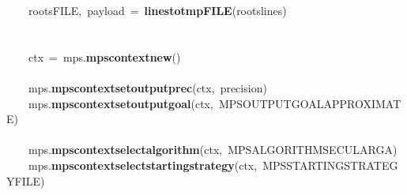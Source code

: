 \documentclass{article}\usepackage[]{graphicx}\usepackage[dvipsnames,table]{xcolor}
\makeatletter
\newcommand{\hlopt}[1]{\textcolor[rgb]{0,0,0}{#1}}%
\newcommand{\hldef}[1]{\textcolor[rgb]{0.345,0.345,0.345}{#1}}%
\newcommand{\hlkwd}[1]{\textcolor[rgb]{0.737,0.353,0.396}{\textbf{#1}}}%
\newenvironment{kframe}{%
 \def\at@end@of@kframe{}%
 \ifinner\ifhmode%
  \def\at@end@of@kframe{\end{minipage}}%
  \begin{minipage}{\columnwidth}%
 \fi\fi%
 \def\FrameCommand##1{\hskip\@totalleftmargin \hskip-\fboxsep
 \colorbox{shadecolor}{##1}\hskip-\fboxsep
     \hskip-\linewidth \hskip-\@totalleftmargin \hskip\columnwidth}%
 \MakeFramed {\advance\hsize-\width
   \@totalleftmargin\z@ \linewidth\hsize
   \@setminipage}}%
 {\par\unskip\endMakeFramed%
 \at@end@of@kframe}
\newenvironment{knitrout}{}{} %
\makeatother
\begin{document}
\begin{center}
\begin{minipage}[m]{18cm}
\begin{knitrout}
\begin{kframe}
\hldef{}\hldef{\ \ \ \ }\hldef{roots\textunderscore FILE}\hlopt{,\ }\hldef{payload\ }\hlopt{=\ }\hldef{}\hlkwd{\textunderscore lines\textunderscore to\textunderscore tmpFILE}\hldef{}\hlopt{(}\hldef{roots\textunderscore lines}\hlopt{)}\hspace*{\fill}\\
\hldef{}\hspace*{\fill}\\
\hldef{}\hldef{\ \ \ \ }\hldef{}\hspace*{\fill}\\
\hldef{}\hldef{\ \ \ \ }\hldef{ctx\ }\hlopt{=\ }\hldef{\textunderscore mps}\hlopt{.}\hldef{}\hlkwd{mps\textunderscore context\textunderscore new}\hldef{}\hlopt{()}\hspace*{\fill}\\
\hldef{}\hspace*{\fill}\\
\hldef{}\hldef{\ \ \ \ }\hldef{\textunderscore mps}\hlopt{.}\hldef{}\hlkwd{mps\textunderscore context\textunderscore set\textunderscore output\textunderscore prec}\hldef{}\hlopt{(}\hldef{ctx}\hlopt{,\ }\hldef{precision}\hlopt{)}\hspace*{\fill}\\
\hldef{}\hldef{\ \ \ \ }\hldef{\textunderscore mps}\hlopt{.}\hldef{}\hlkwd{mps\textunderscore context\textunderscore set\textunderscore output\textunderscore goal}\hldef{}\hlopt{(}\hldef{ctx}\hlopt{,\ }\hldef{MPS\textunderscore OUTPUT\textunderscore GOAL\textunderscore APPROXIMATE}\hlopt{)}\hspace*{\fill}\\
\hldef{}\hspace*{\fill}\\
\hldef{}\hldef{\ \ \ \ }\hldef{\textunderscore mps}\hlopt{.}\hldef{}\hlkwd{mps\textunderscore context\textunderscore select\textunderscore algorithm}\hldef{}\hlopt{(}\hldef{ctx}\hlopt{,\ }\hldef{MPS\textunderscore ALGORITHM\textunderscore SECULAR\textunderscore GA}\hlopt{)}\hspace*{\fill}\\
\hldef{}\hldef{\ \ \ \ }\hldef{\textunderscore mps}\hlopt{.}\hldef{}\hlkwd{mps\textunderscore context\textunderscore select\textunderscore starting\textunderscore strategy}\hldef{}\hlopt{(}\hldef{ctx}\hlopt{,\ }\hldef{MPS\textunderscore STARTING\textunderscore STRATEGY\textunderscore FILE}\hlopt{)}\hspace*{\fill}\\
\hldef{}\hspace*{\fill}\\

\end{kframe}
\end{knitrout}
\end{minipage}
\end{center}
\end{document}
